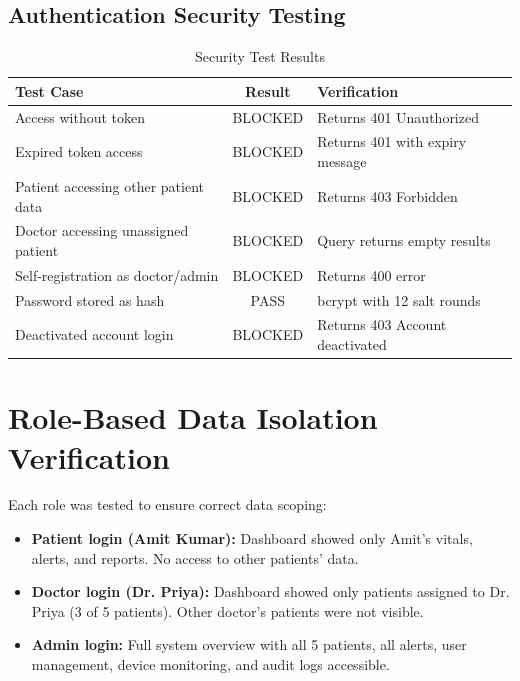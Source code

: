 \subsection{Authentication Security Testing}
\begin{table}[H]
\centering
\caption{Security Test Results}
\label{tab:security}
\begin{tabular}{|p{5cm}|c|p{5cm}|}
\hline
\textbf{Test Case} & \textbf{Result} & \textbf{Verification} \\
\hline
Access without token & BLOCKED & Returns 401 Unauthorized \\
\hline
Expired token access & BLOCKED & Returns 401 with expiry message \\
\hline
Patient accessing other patient data & BLOCKED & Returns 403 Forbidden \\
\hline
Doctor accessing unassigned patient & BLOCKED & Query returns empty results \\
\hline
Self-registration as doctor/admin & BLOCKED & Returns 400 error \\
\hline
Password stored as hash & PASS & bcrypt with 12 salt rounds \\
\hline
Deactivated account login & BLOCKED & Returns 403 Account deactivated \\
\hline
\end{tabular}
\end{table}

\section{Role-Based Data Isolation Verification}
Each role was tested to ensure correct data scoping:
\begin{itemize}[leftmargin=*]
    \item \textbf{Patient login (Amit Kumar):} Dashboard showed only Amit's vitals, alerts, and reports. No access to other patients' data.
    \item \textbf{Doctor login (Dr. Priya):} Dashboard showed only patients assigned to Dr. Priya (3 of 5 patients). Other doctor's patients were not visible.
    \item \textbf{Admin login:} Full system overview with all 5 patients, all alerts, user management, device monitoring, and audit logs accessible.
\end{itemize}

